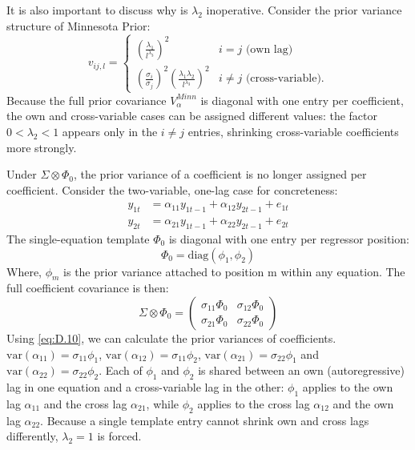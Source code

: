 \documentclass[12pt, a4paper]{article}
\begin{document}
It is also important to discuss why is $\lambda_2$ inoperative. Consider the prior variance structure of Minnesota Prior:
\begin{equation} \label{eq:D.7}
v_{ij,l} = 
\begin{cases} 
\left( \frac{\lambda_1}{l^{\lambda_3}} \right)^2 & i = j \text{ (own lag)} \\ 
\left( \frac{\sigma_i}{\sigma_j} \right)^2 \left( \frac{\lambda_1 \lambda_2}{l^{\lambda_3}} \right)^2 & i \neq j \text{ (cross-variable)}. 
\end{cases}
\end{equation}
Because the full prior covariance $V_\alpha^{Minn}$ is diagonal with one entry per coefficient, the own and cross-variable cases can be assigned different values: the factor $0< \lambda_2 < 1$ appears only in the $i \neq j$ entries, shrinking cross-variable coefficients more strongly.

Under $\Sigma \otimes \Phi_0$, the prior variance of a coefficient is no longer assigned per coefficient. Consider the two-variable, one-lag case for concreteness:
\begin{equation} \label{eq:D.8}
\begin{aligned} 
y_{1t} &= \alpha_{11}y_{1t-1} + \alpha_{12}y_{2t-1} + e_{1t} \\ 
y_{2t} &= \alpha_{21}y_{1t-1} + \alpha_{22}y_{2t-1}+e_{2t} 
\end{aligned}
\end{equation}
The single-equation template $\Phi_0$ is diagonal with one entry per regressor position:
\begin{equation} \label{eq:D.9}
\Phi_0 = \text{diag}(\phi_1, \phi_2)
\end{equation}
Where, $\phi_m$ is the prior variance attached to position m within any equation. The full coefficient covariance is then:
\begin{equation} \label{eq:D.10}
\Sigma \otimes \Phi_0 = \begin{pmatrix} \sigma_{11}\Phi_0 & \sigma_{12}\Phi_0 \\ \sigma_{21}\Phi_0 & \sigma_{22}\Phi_0 \end{pmatrix}
\end{equation}
Using \eqref{eq:D.10}, we can calculate the prior variances of coefficients. $\text{var}(\alpha_{11}) = \sigma_{11}\phi_1$, $\text{var}(\alpha_{12}) = \sigma_{11}\phi_2$, $\text{var}(\alpha_{21}) = \sigma_{22}\phi_1$ and $\text{var}(\alpha_{22}) = \sigma_{22}\phi_2$. Each of $\phi_1$ and $\phi_2$ is shared between an own (autoregressive) lag in one equation and a cross-variable lag in the other: $\phi_1$ applies to the own lag $\alpha_{11}$ and the cross lag $\alpha_{21}$, while $\phi_2$ applies to the cross lag $\alpha_{12}$ and the own lag $\alpha_{22}$. Because a single template entry cannot shrink own and cross lags differently, $\lambda_2 = 1$ is forced.
\end{document}
